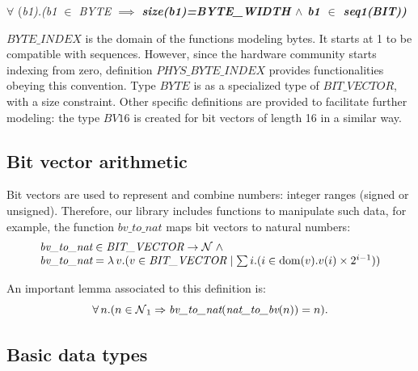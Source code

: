 \documentclass[a4paper]{llncs}
\begin{document}
\hspace*{0.0in}$\forall$ \rm (\it b1\rm )\rm .\rm (\it b1  $\in$  \it BYTE  $\implies$  \bf size\rm (\it b1\rm )\rm =\it BYTE\_WIDTH  $\land$  \it b1  $\in$  \bf seq1\rm (\it BIT\rm )\rm ) 



$\textit{BYTE\_INDEX}$ is the domain of the functions modeling
bytes. It starts at 1 to be compatible with sequences. However, since
the hardware community starts indexing from zero, definition
$\textit{PHYS\_BYTE\_INDEX}$ provides functionalities obeying this
convention. Type $\textit{BYTE}$ is as a specialized type of
$\textit{BIT\_VECTOR}$, with a size constraint. Other specific
definitions are provided to facilitate further modeling: the type
$\textit{BV16}$ is created for bit vectors of length 16 in a similar
way.

\subsection{Bit vector arithmetic}
\label{subsec:Types}
 

Bit vectors are used to represent and combine numbers: integer ranges
(signed or unsigned). Therefore, our library includes functions to
manipulate such data, for example, the function $\textit{bv\_to\_nat}$
maps bit vectors to natural numbers:
$$
\begin{array}{l}
\textit{bv\_to\_nat} \in \textit{BIT\_VECTOR} \fun \nat  \land \\
\textit{bv\_to\_nat} = \lambda v .  (v \in \textit{BIT\_VECTOR} \mid  \sum i . (i \in \dom(v) . v(i)
\times 2^{i-1}))
\end{array}
$$

An important lemma associated to this definition is: 
$$\forall n . (n \in \nat_1 \implies \textit{bv\_to\_nat}(\textit{nat\_to\_bv}(n)) = n).$$



\subsection{Basic data types}
\end{document}
